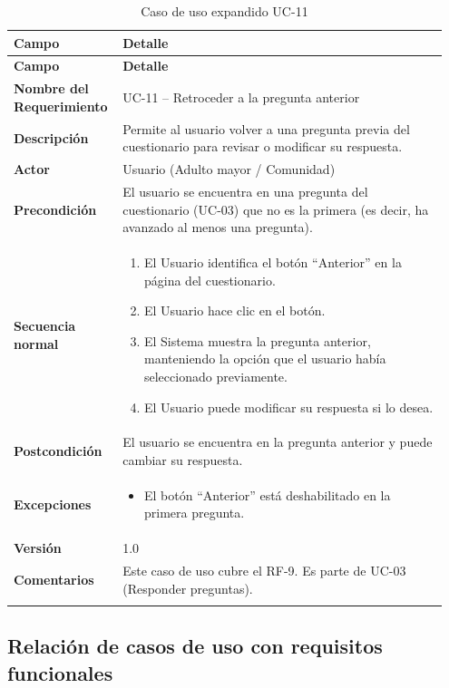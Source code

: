\begin{longtable}{p{0.22\linewidth} p{0.73\linewidth}}
\toprule
\rowcolor{tableheader!20}
\textbf{Campo} & \textbf{Detalle} \\
\midrule
\endfirsthead
\rowcolor{tableheader!20}
\textbf{Campo} & \textbf{Detalle} \\
\midrule
\endhead
\bottomrule
\endfoot
\textbf{Nombre del Requerimiento} & UC-11 -- Retroceder a la pregunta anterior \\
\textbf{Descripción} & Permite al usuario volver a una pregunta previa del cuestionario para revisar o modificar su respuesta. \\
\textbf{Actor} & Usuario (Adulto mayor / Comunidad) \\
\textbf{Precondición} & El usuario se encuentra en una pregunta del cuestionario (UC-03) que no es la primera (es decir, ha avanzado al menos una pregunta). \\
\textbf{Secuencia normal} & 
  \begin{enumerate}
    \item El Usuario identifica el botón ``Anterior'' en la página del cuestionario.
    \item El Usuario hace clic en el botón.
    \item El Sistema muestra la pregunta anterior, manteniendo la opción que el usuario había seleccionado previamente.
    \item El Usuario puede modificar su respuesta si lo desea.
  \end{enumerate} \\
\textbf{Postcondición} & El usuario se encuentra en la pregunta anterior y puede cambiar su respuesta. \\
\textbf{Excepciones} & 
  \begin{itemize}
    \item El botón ``Anterior'' está deshabilitado en la primera pregunta.
  \end{itemize} \\
\textbf{Versión} & 1.0 \\
\textbf{Comentarios} & Este caso de uso cubre el RF-9. Es parte de UC-03 (Responder preguntas). \\
\bottomrule
\caption{Caso de uso expandido UC-11}
\label{tab:uc11}
\end{longtable}

\subsection{Relación de casos de uso con requisitos funcionales}
\label{sec:trazabilidad_casos}

